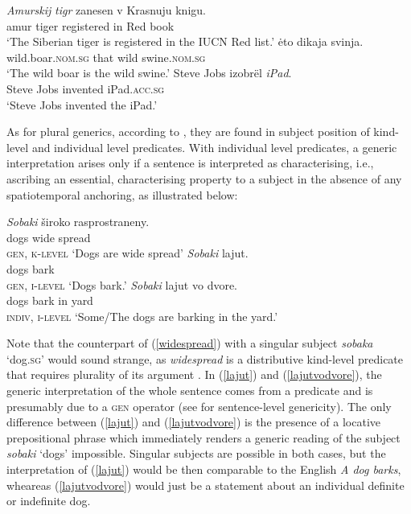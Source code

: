 \documentclass[output=paper,colorlinks,citecolor=brown]{langscibook}
\begin{document}
\ea \label{defkindsR}
\ea \gll \textit{Amurskij} 	\textit{tigr} 	zanesen	 v Krasnuju 	knigu. \label{amurtiger}\\			
amur 		tiger 	registered 	in Red 			book\\
\glt `The Siberian tiger is registered in the IUCN Red list.'
\ex {} \.{e}to dikaja svinja. \\
wild.boar.\textsc{nom.sg}  that wild swine.\textsc{nom.sg} \label{kaban}\\
\glt `The wild boar is the wild swine.'
\ex \gll Steve Jobs izobr\"{e}l \textit{iPad}. \label{ipad}\\
Steve Jobs  invented iPad.\textsc{acc.sg} \\
\glt `Steve Jobs invented the iPad.'
\z
\z

\noindent As for plural generics, according to \citet{seres20}, they are found in subject position of kind-level and individual level predicates. With individual level predicates, a generic interpretation arises only if a sentence is interpreted as characterising, i.e., ascribing an essential, characterising property to a subject in the absence of any spatiotemporal anchoring, as illustrated below: 

\ea \label{plsubjR}
\ea \label{widespread} \gll \textit{Sobaki} \v{s}iroko rasprostraneny.  \\ 
dogs wide spread \\\hfill \textsc{gen, k-level}
\glt `Dogs are wide spread'
\ex \gll \textit{Sobaki} lajut. \label{lajut}  \\
dogs bark \\\hfill  \textsc{gen, i-level}
\glt `Dogs bark.'
\ex \gll  \textit{Sobaki} lajut vo dvore. \label{lajutvodvore}  \\
dogs bark in yard \\\hfill \textsc{indiv, i-level}
\glt `Some/The dogs are barking in the yard.'
\z 
\z

\noindent Note that the counterpart of (\ref{widespread}) with a singular subject \textit{sobaka} `dog.\textsc{sg}' would sound strange, as \textit{widespread} is a distributive kind-level predicate that requires plurality of its argument \citep{chierchia98}. In (\ref{lajut}) and (\ref{lajutvodvore}), the generic interpretation of the whole sentence comes from a predicate and is presumably due to a \textsc{gen} operator (see \citealt{krifkaetal} for sentence-level genericity). The only difference between (\ref{lajut}) and (\ref{lajutvodvore}) is the presence of a locative prepositional phrase which immediately renders a generic reading of the subject \textit{sobaki} `dogs' impossible. Singular subjects are possible in both cases, but the interpretation of (\ref{lajut}) would be then comparable to the English \textit{A dog barks}, wheareas (\ref{lajutvodvore}) would just be a statement about an individual definite or indefinite dog. 
\end{document}
